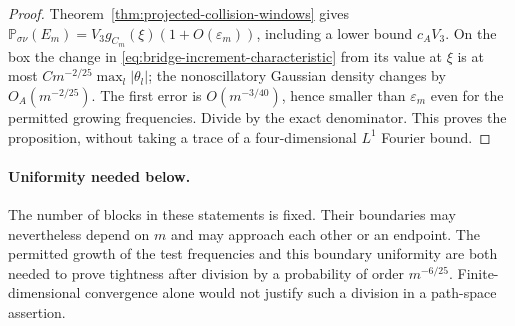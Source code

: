 \begin{proof}
Theorem~\ref{thm:projected-collision-windows} gives
$\mathbb P_{\sigma\nu}(E_m)=V_3g_{C_m}(\xi)(1+O(\varepsilon_m))$,
including a lower bound $c_A V_3$. On the box the change in
\eqref{eq:bridge-increment-characteristic} from its value at $\xi$
is at most $C m^{-2/25}\max_l|\theta_l|$; the nonoscillatory
Gaussian density changes by $O_A(m^{-2/25})$. The first error is
$O(m^{-3/40})$, hence smaller than $\varepsilon_m$ even for the
permitted growing frequencies. Divide by the exact denominator.
This proves the proposition, without taking a trace of a
four-dimensional $L^1$ Fourier bound.
\end{proof}

\paragraph{Uniformity needed below.}
The number of blocks in these statements is fixed. Their boundaries
may nevertheless depend on $m$ and may approach each other or an
endpoint. The permitted growth of the test frequencies and this
boundary uniformity are both needed to prove tightness after division
by a probability of order $m^{-6/25}$. Finite-dimensional convergence
alone would not justify such a division in a path-space assertion.
